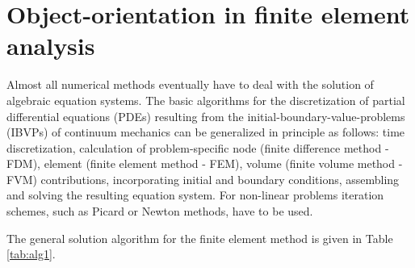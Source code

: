 \section{Object-orientation in finite element analysis}
\label{sec:ovl}

Almost all numerical methods eventually have to deal with the
solution of algebraic equation systems. The basic algorithms for
the discretization of partial differential equations (PDEs)
resulting from the initial-boundary-value-problems (IBVPs) of
continuum mechanics can be generalized in principle as follows:
time discretization, calculation of problem-specific node (finite
difference method - FDM), element (finite element method - FEM),
volume (finite volume method - FVM) contributions, incorporating
initial and boundary conditions, assembling and solving the resulting
equation system. For non-linear problems iteration schemes, such
as Picard or Newton methods, have to be used.

The general solution algorithm for the finite element method is
given in Table \ref{tab:alg1}.

\newpage

